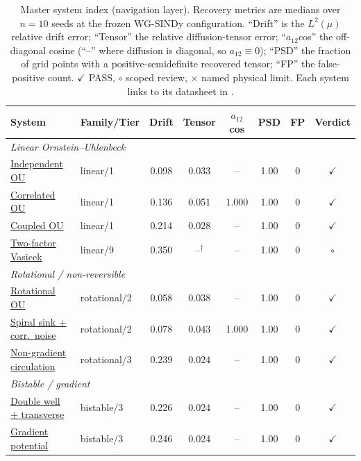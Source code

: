 \begin{table}[t]\centering\small
\caption{Master system index (navigation layer). Recovery metrics are medians over $n=10$ seeds at the frozen
WG-SINDy configuration. ``Drift'' is the $L^2(\mu)$ relative drift error; ``Tensor'' the relative diffusion-tensor
error; ``$a_{12}$cos'' the off-diagonal cosine (``--'' where diffusion is diagonal, so $a_{12}\equiv0$);
``PSD'' the fraction of grid points with a positive-semidefinite recovered tensor; ``FP'' the false-positive
count. $\checkmark$ PASS, $\circ$ scoped review, $\times$ named physical limit. Each system links to its
datasheet in .}\label{tab:master}
\begin{tabular}{l l c c c c c c}
\toprule
System & Family/Tier & Drift & Tensor & $a_{12}$cos & PSD & FP & Verdict \\
\midrule
\multicolumn{8}{l}{\textit{Linear Ornstein--Uhlenbeck}}\\
\hyperref[sec:v62-indep-ou]{Independent OU} & linear/1 & 0.098 & 0.033 & -- & 1.00 & 0 & $\checkmark$ \\
\hyperref[sec:v62-correlated-ou]{Correlated OU} & linear/1 & 0.136 & 0.051 & 1.000 & 1.00 & 0 & $\checkmark$ \\
\hyperref[sec:v62-coupled-ou]{Coupled OU} & linear/1 & 0.214 & 0.028 & -- & 1.00 & 0 & $\checkmark$ \\
\hyperref[sec:v62-two-factor-vasicek]{Two-factor Vasicek} & linear/9 & 0.350 & --$^\dagger$ & -- & 1.00 & 0 & $\circ$ \\
\midrule
\multicolumn{8}{l}{\textit{Rotational / non-reversible}}\\
\hyperref[sec:v62-rotational-ou]{Rotational OU} & rotational/2 & 0.058 & 0.038 & -- & 1.00 & 0 & $\checkmark$ \\
\hyperref[sec:v62-spiral-sink-corr]{Spiral sink + corr.\ noise} & rotational/2 & 0.078 & 0.043 & 1.000 & 1.00 & 0 & $\checkmark$ \\
\hyperref[sec:v62-nongradient-circulation]{Non-gradient circulation} & rotational/3 & 0.239 & 0.024 & -- & 1.00 & 0 & $\checkmark$ \\
\midrule
\multicolumn{8}{l}{\textit{Bistable / gradient}}\\
\hyperref[sec:v62-double-well-transverse]{Double well + transverse} & bistable/3 & 0.226 & 0.024 & -- & 1.00 & 0 & $\checkmark$ \\
\hyperref[sec:v62-gradient-potential]{Gradient potential} & bistable/3 & 0.246 & 0.024 & -- & 1.00 & 0 & $\checkmark$ \\

\end{tabular}
\end{table}
